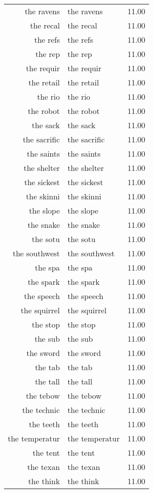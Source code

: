 \begin{table}[ht]
\begin{tabular}{rlr}
  the ravens & the ravens & 11.00 \\ 
  the recal & the recal & 11.00 \\ 
  the refs & the refs & 11.00 \\ 
  the rep & the rep & 11.00 \\ 
  the requir & the requir & 11.00 \\ 
  the retail & the retail & 11.00 \\ 
  the rio & the rio & 11.00 \\ 
  the robot & the robot & 11.00 \\ 
  the sack & the sack & 11.00 \\ 
  the sacrific & the sacrific & 11.00 \\ 
  the saints & the saints & 11.00 \\ 
  the shelter & the shelter & 11.00 \\ 
  the sickest & the sickest & 11.00 \\ 
  the skinni & the skinni & 11.00 \\ 
  the slope & the slope & 11.00 \\ 
  the snake & the snake & 11.00 \\ 
  the sotu & the sotu & 11.00 \\ 
  the southwest & the southwest & 11.00 \\ 
  the spa & the spa & 11.00 \\ 
  the spark & the spark & 11.00 \\ 
  the speech & the speech & 11.00 \\ 
  the squirrel & the squirrel & 11.00 \\ 
  the stop & the stop & 11.00 \\ 
  the sub & the sub & 11.00 \\ 
  the sword & the sword & 11.00 \\ 
  the tab & the tab & 11.00 \\ 
  the tall & the tall & 11.00 \\ 
  the tebow & the tebow & 11.00 \\ 
  the technic & the technic & 11.00 \\ 
  the teeth & the teeth & 11.00 \\ 
  the temperatur & the temperatur & 11.00 \\ 
  the tent & the tent & 11.00 \\ 
  the texan & the texan & 11.00 \\ 
  the think & the think & 11.00 \\ 

\end{tabular}
\end{table}
